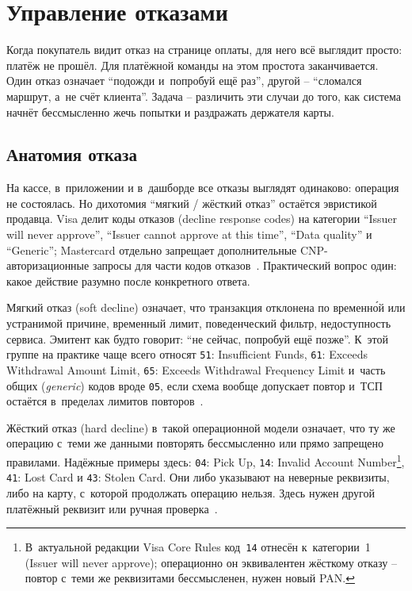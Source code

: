 
\chapter{Управление отказами}\label{ch:decline-management}

Когда покупатель видит отказ на странице оплаты, для него всё выглядит
просто: платёж не прошёл. Для платёжной команды на этом простота
заканчивается. Один отказ означает \enquote{подожди и~попробуй ещё раз},
другой -- \enquote{сломался маршрут, а~не счёт клиента}. Задача --
различить эти случаи до того, как система начнёт бессмысленно жечь
попытки и раздражать держателя карты.

\section{Анатомия отказа}\label{sec:decline-anatomy}

На кассе, в~приложении и в~дашборде все отказы выглядят одинаково:
операция не состоялась. Но дихотомия \enquote{мягкий /
жёсткий отказ} остаётся эвристикой продавца. Visa делит
коды отказов (decline response codes) на категории
\enquote{Issuer will never approve}, \enquote{Issuer cannot approve at this
time}, \enquote{Data quality} и \enquote{Generic}; Mastercard
отдельно запрещает дополнительные CNP-авторизационные запросы для части
кодов отказов~\cite{visa-core-rules,mc-tpr}. Практический вопрос
один: какое действие разумно после конкретного ответа.

Мягкий отказ (soft decline) означает, что транзакция отклонена по
временн\'{о}й или устранимой причине, временный лимит, поведенческий
фильтр, недоступность сервиса. Эмитент как будто говорит:
\enquote{не сейчас, попробуй ещё позже}. К~этой группе на практике чаще
всего относят \texttt{51}: Insufficient Funds, \texttt{61}:
Exceeds Withdrawal
Amount Limit, \texttt{65}: Exceeds Withdrawal
Frequency Limit и~часть общих (\textit{generic}) кодов вроде \texttt{05}, если схема вообще
допускает повтор и~ТСП остаётся в~пределах лимитов
повторов~\cite{visa-core-rules}.

Жёсткий отказ (hard decline) в~такой операционной модели означает, что ту
же операцию с~теми же данными повторять бессмысленно или прямо запрещено
правилами. Надёжные примеры здесь: \texttt{04}: Pick Up, \texttt{14}:
Invalid Account Number\footnote{В~актуальной редакции Visa Core Rules
код~\texttt{14} отнесён к~категории~1 (Issuer will never approve);
операционно он эквивалентен жёсткому отказу -- повтор с~теми же
реквизитами бессмысленен, нужен новый PAN.},
\texttt{41}: Lost Card и \texttt{43}: Stolen Card.
Они либо указывают на неверные реквизиты, либо на карту, с~которой
продолжать операцию нельзя. Здесь нужен другой платёжный реквизит или
ручная проверка~\cite{visa-core-rules,mc-tpr}.

